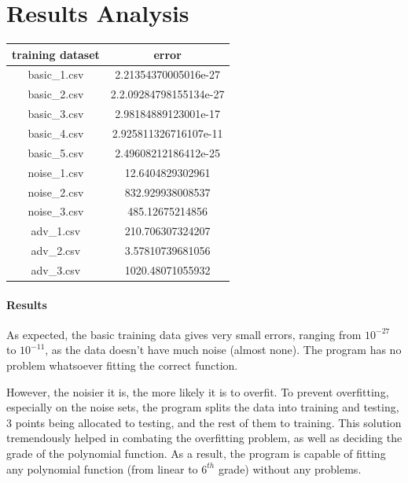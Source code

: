 \documentclass[notitlepage, 11pt]{report}
\begin{document}
				
		\section{Results Analysis}
				
		
		

			
			{
				\def\arraystretch{1.5}
			\begin{longtable}{ | c | c | }
				\hline
				training dataset & error\\ [1ex]
				\hline
				basic\_1.csv & 2.21354370005016e-27 \\ 
				\hline
				basic\_2.csv & 2.2.09284798155134e-27 \\
				\hline
				basic\_3.csv & 2.98184889123001e-17 \\
				\hline
				basic\_4.csv & 2.925811326716107e-11 \\
				\hline
				basic\_5.csv & 2.49608212186412e-25 \\
				\hline
				noise\_1.csv & 12.6404829302961 \\
				\hline
				noise\_2.csv & 832.929938008537 \\
				\hline
				noise\_3.csv & 485.12675214856 \\
				\hline
				adv\_1.csv & 210.706307324207 \\
				\hline
				adv\_2.csv & 3.57810739681056 \\
				\hline
				adv\_3.csv & 1020.48071055932 \\
				\hline
			\end{longtable}
		}

	
	\paragraph{Results}
	As expected, the basic training data gives very small errors, ranging from $10^{-27}$ to $10^{-11}$, as the data doesn't have much noise (almost none). The program has no problem whatsoever fitting the correct function.
	
	However, the noisier it is, the more likely it is to overfit. To prevent overfitting, especially on the noise sets, the program splits the data into training and testing, 3 points being allocated to testing, and the rest of them to training. This solution tremendously helped in combating the overfitting problem, as well as deciding the grade of the polynomial function. As a result, the program is capable of fitting any polynomial function (from linear to $6^{th}$ grade) without any problems. 
	
\end{document}

